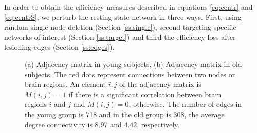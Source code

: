 \documentclass[12pt,a4paper]{article}
\begin{document}
In order to obtain the efficiency measures described in equations \ref{eq:centr} and \ref{eq:centrS}, we perturb the resting state network in three ways. First, using random single node deletion (Section \ref{ss:single}),  second targeting specific networks of interest (Section \ref{ss:target}) and third the efficiency loss after lesioning edges (Section \ref{ss:edges}). 

\begin{figure}[H]
    \hfill
    \caption{\small (a) Adjacency matrix in young subjects.   
  \small (b) Adjacency matrix in old subjects. The red dots represent connections between two nodes or brain regions. An element $i,j$ of the adjacency matrix is $M(i,j) =1$ if there is a significant correlation between brain regions $i$ and $j$ and $M(i,j) =0$, otherwise.  The number of edges in the young group is 718 and in the old group is 308, the average degree connectivity is 8.97 and 4.42, respectively.}
    \label{fig:adjmat}
  \end{figure} 
 
\end{document}
